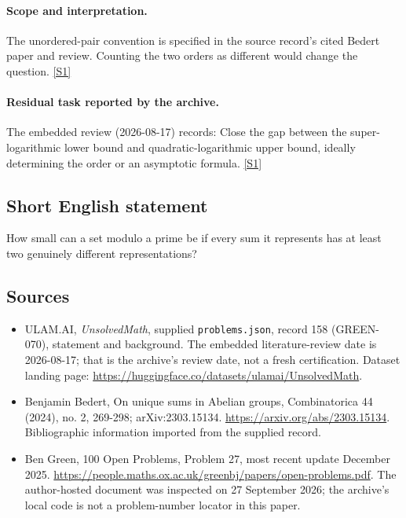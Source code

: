 \documentclass[11pt,a4paper]{article}
\newcommand{\sref}[2]{\hyperlink{source:#1:#2}{[S#2]}}
\begin{document}
\paragraph{Scope and interpretation.}

The unordered-pair convention is specified in the source record’s cited Bedert paper and review. Counting the two orders as different would change the question. \sref{158}{1}

\paragraph{Residual task reported by the archive.}

The embedded review (2026-08-17) records: Close the gap between the super-logarithmic lower bound and quadratic-logarithmic upper bound, ideally determining the order or an asymptotic formula. \sref{158}{1}

\subsection{Short English statement}

How small can a set modulo a prime be if every sum it represents has at least two genuinely different representations?

\subsection{Sources}

{\small

\begin{itemize}

\item[\hypertarget{source:158:1}{S1}] ULAM.AI, \emph{UnsolvedMath}, supplied \texttt{problems.json}, record 158 (GREEN-070), statement and background. The embedded literature-review date is 2026-08-17; that is the archive’s review date, not a fresh certification. Dataset landing page: \url{https://huggingface.co/datasets/ulamai/UnsolvedMath}.

\item[\hypertarget{source:158:2}{S2}] Benjamin Bedert, On unique sums in Abelian groups, Combinatorica 44 (2024), no. 2, 269-298; arXiv:2303.15134. \url{https://arxiv.org/abs/2303.15134}. Bibliographic information imported from the supplied record.

\item[\hypertarget{source:158:3}{S3}] Ben Green, 100 Open Problems, Problem 27, most recent update December 2025. \url{https://people.maths.ox.ac.uk/greenbj/papers/open-problems.pdf}. The author-hosted document was inspected on 27 September 2026; the archive’s local code is not a problem-number locator in this paper.

\end{itemize}

}

\label{end:158}
\end{document}
